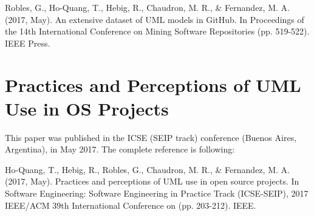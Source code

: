 \documentclass[a4paper, 12pt]{book}
\begin{document}
Robles, G., Ho-Quang, T., Hebig, R., Chaudron, M. R., \& Fernandez, M. A. (2017, May). An extensive dataset of UML models in GitHub. In Proceedings of the 14th International Conference on Mining Software Repositories (pp. 519-522). IEEE Press.


\section{Practices and Perceptions of UML Use in OS Projects}
\label{sec:paper-icse}
This paper was published in the ICSE (SEIP track) conference (Buenos Aires, Argentina), in May 2017. The complete reference is following:

Ho-Quang, T., Hebig, R., Robles, G., Chaudron, M. R., \& Fernandez, M. A. (2017, May). Practices and perceptions of UML use in open source projects. In Software Engineering: Software Engineering in Practice Track (ICSE-SEIP), 2017 IEEE/ACM 39th International Conference on (pp. 203-212). IEEE.


\end{document}
